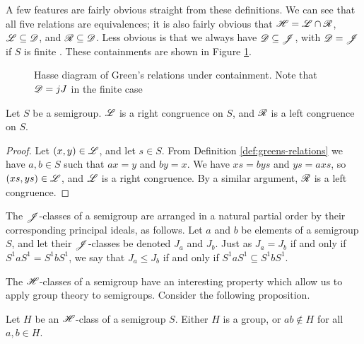 A few features are fairly obvious straight from these definitions.  We can see
that all five relations are equivalences; it is also fairly obvious that
$\mathscr{H} = \mathscr{L} \cap \mathscr{R}$, $\mathscr{L} \subseteq \mathscr{D}$, and $\mathscr{R} \subseteq \mathscr{D}$.  Less
obvious is that we always have $\mathscr{D} \subseteq \mathscr{J}$, with $\mathscr{D} = \mathscr{J}$ if $S$ is
finite \cite[\S2.1]{howie}.  These containments are shown in Figure
\ref{fig:greens-containment}.

\begin{figure}[ht]
  \centering
  \caption[Hasse diagram of Green's relations under containment]{Hasse diagram
    of Green's relations under containment.  Note that $\mathscr{D} = jJ$ in the finite
    case}
  \label{fig:greens-containment}
\end{figure}

\begin{proposition}
  \label{prop:greens-as-congs}
  Let $S$ be a semigroup.  $\mathrel{\mathscr{L}}$ is a right congruence on $S$, and $\mathrel{\mathscr{R}}$ is a
  left congruence on $S$.
  \begin{proof}
    Let $(x,y) \in \mathscr{L}$, and let $s \in S$.  From Definition
    \ref{def:greens-relations} we have $a,b \in S$ such that $ax=y$ and $by=x$.
    We have $xs = bys$ and $ys = axs$, so $(xs,ys) \in \mathscr{L}$, and $\mathrel{\mathscr{L}}$ is a
    right congruence.  By a similar argument, $\mathrel{\mathscr{R}}$ is a left congruence.
  \end{proof}
\end{proposition}

The $\mathrel{\mathscr{J}}$-classes of a semigroup are arranged in a natural partial order by
their corresponding principal ideals, as follows.  Let $a$ and $b$ be elements
of a semigroup $S$, and let their $\mathrel{\mathscr{J}}$-classes be denoted $J_a$ and $J_b$.
Just as $J_a = J_b$ if and only if $S^1aS^1 = S^1bS^1$, we say that
$J_a \leq J_b$ if and only if $S^1aS^1 \subseteq S^1bS^1$.

The $\mathrel{\mathscr{H}}$-classes of a semigroup have an interesting property which allow us to
apply group theory to semigroups.  Consider the following proposition.

\begin{proposition}
  \label{prop:group-h-class}
  Let $H$ be an $\mathrel{\mathscr{H}}$-class of a semigroup $S$.  Either $H$ is a group, or
  $ab \notin H$ for all $a,b \in H$.
\end{proposition}

